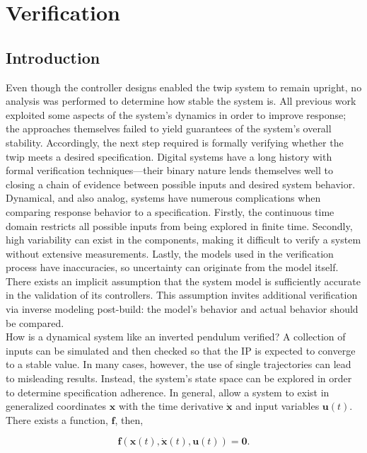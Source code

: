 \chapter{Verification}

\section{Introduction}

Even though the controller designs enabled the \gls{twip} system to remain upright, no analysis was performed to determine how stable the system is. All previous work exploited some aspects of the system's dynamics in order to improve response; the approaches themselves failed to yield guarantees of the system's overall stability. Accordingly, the next step required is formally verifying whether the \gls{twip} meets a desired specification. Digital systems have a long history with formal verification techniques---their binary nature lends themselves well to closing a chain of evidence between possible inputs and desired system behavior. \\

Dynamical, and also analog, systems have numerous complications when comparing response behavior to a specification. Firstly, the continuous time domain restricts all possible inputs from being explored in finite time. Secondly, high variability can exist in the components, making it difficult to verify a system without extensive measurements. Lastly, the models used in the verification process have inaccuracies, so uncertainty can originate from the model itself. There exists an implicit assumption that the system model is sufficiently accurate in the validation of its controllers. This assumption invites additional verification via inverse modeling post-build: the model's behavior and actual behavior should be compared. \\

How is a dynamical system like an inverted pendulum verified? A collection of inputs can be simulated and then checked so that the IP is expected to converge to a stable value. In many cases, however, the use of single trajectories can lead to misleading results. Instead, the system's state space can be explored in order to determine specification adherence. In general, allow a system to exist in generalized coordinates $\bm{x}$ with the time derivative $\dot{\bm{x}}$ and input variables $\bm{u}(t)$. There exists a function, $\bm{f}$, then,

\begin{equation}
    \bm{f} \left( \bm{x}(t), \dot{\bm{x}}(t), \bm{u}(t) \right) = \bm{0}.
\end{equation}

